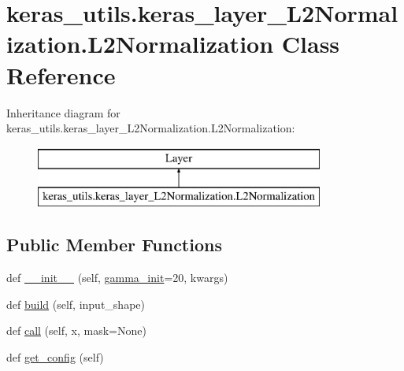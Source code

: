 \hypertarget{classkeras__utils_1_1keras__layer___l2_normalization_1_1_l2_normalization}{}\section{keras\+\_\+utils.\+keras\+\_\+layer\+\_\+\+L2\+Normalization.\+L2\+Normalization Class Reference}
\label{classkeras__utils_1_1keras__layer___l2_normalization_1_1_l2_normalization}
Inheritance diagram for keras\+\_\+utils.\+keras\+\_\+layer\+\_\+\+L2\+Normalization.\+L2\+Normalization\+:\begin{figure}[H]
\begin{center}
\leavevmode
\includegraphics[height=2.000000cm]{classkeras__utils_1_1keras__layer___l2_normalization_1_1_l2_normalization}
\end{center}
\end{figure}
\subsection*{Public Member Functions}
\begin{DoxyCompactItemize}
\item 
def \hyperlink{classkeras__utils_1_1keras__layer___l2_normalization_1_1_l2_normalization_a44d3d7b777a42cb28b5bbbcead7b2725}{\+\_\+\+\_\+init\+\_\+\+\_\+} (self, \hyperlink{classkeras__utils_1_1keras__layer___l2_normalization_1_1_l2_normalization_a692198f0ef32ded740d28f5e89684a0e}{gamma\+\_\+init}=20, kwargs)
\item 
def \hyperlink{classkeras__utils_1_1keras__layer___l2_normalization_1_1_l2_normalization_a9111c56e1f9a28a8ab53389883587cd4}{build} (self, input\+\_\+shape)
\item 
def \hyperlink{classkeras__utils_1_1keras__layer___l2_normalization_1_1_l2_normalization_ac9f98847106a0787d750ef82b2bc702b}{call} (self, x, mask=None)
\item 
def \hyperlink{classkeras__utils_1_1keras__layer___l2_normalization_1_1_l2_normalization_a7202c20f7a98115dfc7882062cbf61af}{get\+\_\+config} (self)
\end{DoxyCompactItemize}
